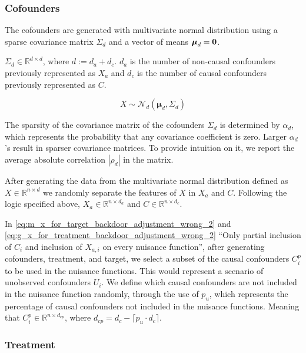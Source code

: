 \documentclass{article}
\numberwithin{equation}{section}
\begin{document}
\subsubsection{Cofounders}

The cofounders are generated with multivariate normal distribution using a sparse covariance matrix $\Sigma_d$ and a vector of means $\boldsymbol{\mu}_d = \bf{0}$.

$\Sigma_d \in \mathbb{R}^{d \times d}$, where $d := d_a + d_c$. $d_a$ is the number of non-causal confounders previously represented as $X_a$ and $d_c$ is the number of causal confounders previously represented as $C$.

\begin{equation}
    \label{eq:cofounders_data_generating_process}
    X \sim \mathcal{N}_d(\boldsymbol{\mu}_d, \Sigma_d)
\end{equation}

The sparsity of the covariance matrix of the cofounders $\Sigma_d$ is determined by $\alpha_d$, which represents the probability that any covariance coefficient is zero. Larger $\alpha_d$'s result in sparser covariance matrices. To provide intuition on it, we report the average absolute correlation ${|\rho_d|}$ in the matrix.

After generating the data from the multivariate normal distribution defined as $X \in \mathbb{R}^{n \times d}$ we randomly separate the features of $X$ in $X_a$ and $C$. Following the logic specified above, $X_a \in \mathbb{R}^{n \times d_a}$ and $C \in \mathbb{R}^{n \times d_c}$.

In \eqref{eq:m_x_for_target_backdoor_adjustment_wrong_2} and \eqref{eq:g_x_for_treatment_backdoor_adjustment_wrong_2} ``Only partial inclusion of $C_i$ and inclusion of $X_{a, i}$ on every nuisance function'', after generating cofounders, treatment, and target, we select a subset of the causal confounders $C^{p}_i$ to be used in the nuisance functions. This would represent a scenario of unobserved confounders $U_i$. We define which causal confounders are not included in the nuisance function randomly, through the use of $p_u$, which represents the percentage of causal confounders not included in the nuisance functions. Meaning that $C^{p}_i \in \mathbb{R}^{n \times d_{cp}}$, where $d_{cp} = d_c - \lceil p_u \cdot d_c \rceil$.

\subsubsection{Treatment}
\end{document}
